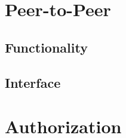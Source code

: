 \documentclass{book}
\begin{document}
\section{Peer-to-Peer}
\label{sec:isis_peer_to_peer}

\subsection{Functionality}
\label{sub:peer_to_peer_functionality}























\subsection{Interface}
\label{sub:isis_peer_to_peer_interface}



\section{Authorization}
\label{sec:isis_authorization}
\end{document}
